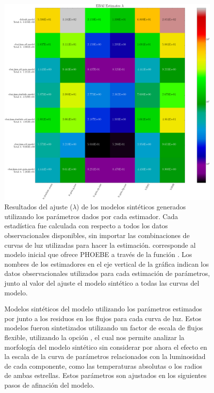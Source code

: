 \begin{figure}[!ht]
	\centering
	\includegraphics[scale=0.325]{Metodologia/Secciones/ModeloComputacional/Figures/EstimadoresChiResultados.png}
	\caption{Resultados del ajuste ($\lambda$) de los modelos sintéticos
		generados utilizando los parámetros dados por cada estimador. Cada
		estadística fue calculada con respecto a todos los datos observacionales
		disponibles, sin importar las combinaciones de curvas de luz utilizadas
		para hacer la estimación.  corresponde al modelo
		inicial que ofrece PHOEBE a través de la función
		. Los nombres de los estimadores
		en el eje vertical de la gráfica indican los datos observacionales
		utilizados para cada estimación de parámetros, junto al valor del ajuste
		el modelo sintético a todas las curvas del modelo. }
	\label{figuraEstimadoresLambda}
\end{figure}

\begin{figure}[!ht]
	\centering

	\caption{Modelos sintéticos del modelo utilizando los parámetros estimados
	por  junto a los residuos en los flujos
	para cada curva de luz. Estos modelos fueron sintetizados utilizando un
	factor de escala de flujos flexible, utilizando la opción , el cual nos permite analizar la morfología del modelo
	sintético sin considerar por ahora el efecto en la escala de la curva de
	parámetros relacionados con la luminosidad de cada componente, como las
	temperaturas absolutas o los radios de ambas estrellas. Estos parámetros son
	ajustados en los siguientes pasos de afinación del modelo.}
	\label{figuraEstimacionInicialModelo}
\end{figure}

